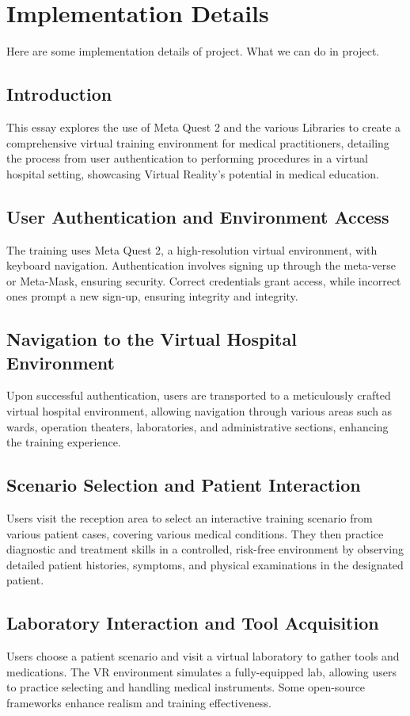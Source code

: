 \chapter{Implementation Details}
\label{ch:implementation}
{Here are some implementation details of project. What we can do in project.}
\section{Introduction}
This essay explores the use of Meta Quest 2 and the various Libraries to create a comprehensive virtual training environment for medical practitioners, detailing the process from user authentication to performing procedures in a virtual hospital setting, showcasing Virtual Reality's potential in medical education.
\section{User Authentication and Environment Access}
The training uses Meta Quest 2, a high-resolution virtual environment, with keyboard navigation. Authentication involves signing up through the meta-verse or Meta-Mask, ensuring security. Correct credentials grant access, while incorrect ones prompt a new sign-up, ensuring integrity and integrity.
\section{Navigation to the Virtual Hospital Environment}
Upon successful authentication, users are transported to a meticulously crafted virtual hospital environment, allowing navigation through various areas such as wards, operation theaters, laboratories, and administrative sections, enhancing the training experience.
\section{Scenario Selection and Patient Interaction}
Users visit the reception area to select an interactive training scenario from various patient cases, covering various medical conditions. They then practice diagnostic and treatment skills in a controlled, risk-free environment by observing detailed patient histories, symptoms, and physical examinations in the designated patient.
\section{Laboratory Interaction and Tool Acquisition}
Users choose a patient scenario and visit a virtual laboratory to gather tools and medications. The VR environment simulates a fully-equipped lab, allowing users to practice selecting and handling medical instruments. Some open-source frameworks enhance realism and training effectiveness.
